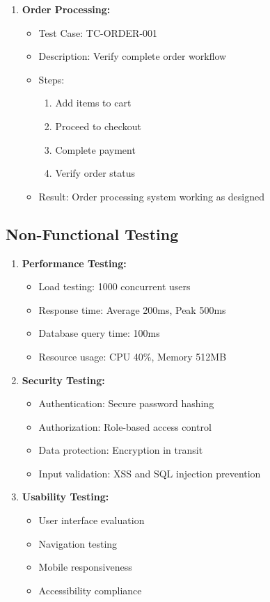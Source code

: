 \begin{enumerate}
    \item \textbf{Order Processing:}
    \begin{itemize}
        \item Test Case: TC-ORDER-001
        \item Description: Verify complete order workflow
        \item Steps:
        \begin{enumerate}
            \item Add items to cart
            \item Proceed to checkout
            \item Complete payment
            \item Verify order status
        \end{enumerate}
        \item Result: Order processing system working as designed
    \end{itemize}
\end{enumerate}

\subsection{Non-Functional Testing}
\begin{enumerate}
    \item \textbf{Performance Testing:}
    \begin{itemize}
        \item Load testing: 1000 concurrent users
        \item Response time: Average 200ms, Peak 500ms
        \item Database query time: 100ms
        \item Resource usage: CPU 40\%, Memory 512MB
    \end{itemize}

    \item \textbf{Security Testing:}
    \begin{itemize}
        \item Authentication: Secure password hashing
        \item Authorization: Role-based access control
        \item Data protection: Encryption in transit
        \item Input validation: XSS and SQL injection prevention
    \end{itemize}

    \item \textbf{Usability Testing:}
    \begin{itemize}
        \item User interface evaluation
        \item Navigation testing
        \item Mobile responsiveness
        \item Accessibility compliance
    \end{itemize}
\end{enumerate}

